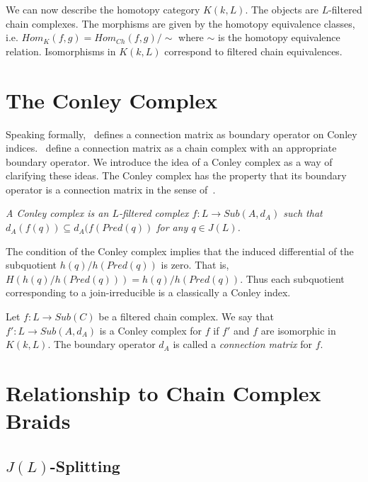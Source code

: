 We can now describe the homotopy category $K(k,L)$.  The objects are $L$-filtered chain complexes.  The morphisms are given by the homotopy equivalence classes, i.e. $Hom_K(f,g) = Hom_{Ch}(f,g)/\sim$ where $\sim$ is the homotopy equivalence relation.   Isomorphisms in $K(k,L)$ correspond to filtered chain equivalences.




\section{The Conley Complex}

Speaking formally,~\cite{fran} defines a connection matrix as boundary operator on Conley indices.~\cite{salamon} define a connection matrix as a chain complex with an appropriate boundary operator.    We introduce the idea of a Conley complex as a way of clarifying these ideas.  The Conley complex has the property that its boundary operator is a connection matrix in the sense of~\cite{fran}.   

\begin{defn}
{\em A Conley complex is an $L$-filtered complex $f:L\to Sub(A,d_A)$ such that $d_A(f(q))\subseteq d_A(f(Pred(q))$ for any $q\in J(L)$.
}
\end{defn}

The condition of the Conley complex implies that the induced differential of the subquotient $h(q)/h(Pred(q))$ is zero.  That is, $H(h(q)/h(Pred(q))) = h(q)/h(Pred(q))$.   Thus each subquotient corresponding to a join-irreducible is a classically a Conley index.  



Let $f:L\to Sub(C)$ be a filtered chain complex.  We say that $f':L\to Sub(A,d_A)$ is a Conley complex for $f$ if $f'$ and $f$ are isomorphic in $K(k,L)$.  The boundary operator $d_A$ is called a {\em connection matrix} for $f$. 



\section{Relationship to Chain Complex Braids}

\subsection{$J(L)$-Splitting}

